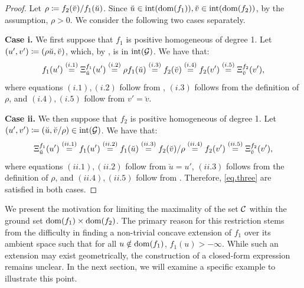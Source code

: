 \begin{proof}
  Let $\rho \coloneqq  f_2(\breve{v}) / f_1(\breve{u})$.  Since $\breve{u} \in \operatorname{int}(\operatorname{dom}(f_1)), \breve{v} \in \operatorname{int}(\operatorname{dom}(f_2))$, by the assumption, $\rho  > 0 $.  We consider the following two cases separately.
  
  \textbf{Case i.} We first suppose that $f_1$ is positive homogeneous of degree 1.  Let $(u', v')\coloneqq (\rho \breve{u}, \breve{v})$, which,  by , is in $\operatorname{int}(\mathcal G)$.
We have that:
$$ 
  	f_1(u') \stackrel{(i.1)} = {\Xi^{f_1}_{\breve{u}}}(u')
    	\stackrel{(i.2)}= \rho f_1(\breve{u})
    	\stackrel{(i.3)}= f_2(\breve{v})
    	\stackrel{(i.4)}= f_2(v') \stackrel{(i.5)}= {\Xi^{f_2}_{\breve{v}}}(v'),
 $$ 
where equations $(i.1),(i.2)$ follow from ,   $(i.3)$ follows from the definition of $\rho$, and $(i.4),(i.5)$  follow from $v'=\breve{v}$.
 
 \textbf{Case ii.}
We then suppose that $f_2$ is positive homogeneous of degree 1.  Let $(u', v')\coloneqq ( \breve{u}, \breve{v} / \rho) \in \operatorname{int}(\mathcal G)$.
We have that:
$$
{\Xi^{f_1}_{\breve{u}}}(u')   \stackrel{(ii.1)} =   f_1(u') \stackrel{(ii.2)} =  f_1(\breve{u})  
    	 \stackrel{(ii.3)} =  f_2(\breve{v}) /  \rho      	 \stackrel{(ii.4)} =   f_2(v') 
    	 \stackrel{(ii.5)} = {\Xi^{f_2}_{\breve{v}}}(v'),
$$
	where equations $(ii.1), (ii.2)$ follow from $\breve{u} = u'$,  $(ii.3)$ follows from the definition of $\rho$, and  $(ii.4),(ii.5)$ follow  from .  Therefore, \eqref{eq.three} are satisfied in both cases.
\end{proof}



We present the motivation for limiting the maximality of the set $\mathcal C$ within the ground set $\operatorname{dom}(f_1) \times \operatorname{dom}(f_2)$. The primary reason for this restriction stems from the difficulty in finding a non-trivial concave extension of $f_1$ over its ambient space such that  for all $u \notin \operatorname{dom}(f_1)$, $f_1(u) > -\infty$. While such an extension may exist geometrically, the construction of a closed-form expression remains unclear. In the next section, we will examine a specific example to illustrate this point.

